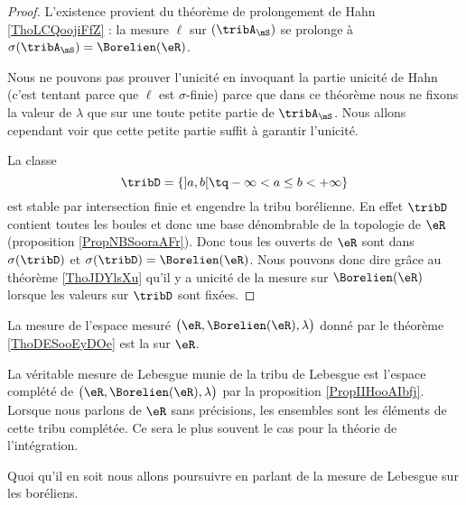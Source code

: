\begin{proof}
    
    L'existence provient du théorème de prolongement de Hahn \ref{ThoLCQoojiFfZ} : la mesure \( \ell\) sur \( (\tribA_{\mS})\) se prolonge à \( \sigma(\tribA_{\mS})=\Borelien(\eR)\).

    Nous ne pouvons pas prouver l'unicité en invoquant la partie unicité de Hahn (c'est tentant parce que \( \ell\) est \( \sigma\)-finie) parce que dans ce théorème nous ne fixons la valeur de \( \lambda\) que sur une toute petite partie de \( \tribA_{\mS}\). Nous allons cependant voir que cette petite partie suffit à garantir l'unicité.

    La classe 
    \begin{equation}
        \tribD=\{ \mathopen] a , b \mathclose[\tq -\infty<a\leq b< +\infty \}
    \end{equation}
    est stable par intersection finie et engendre la tribu borélienne. En effet \( \tribD\) contient toutes les boules et donc une base dénombrable de la topologie de \( \eR\) (proposition \ref{PropNBSooraAFr}). Donc tous les ouverts de \( \eR\) sont dans \( \sigma(\tribD)\) et \( \sigma(\tribD)=\Borelien(\eR)\). Nous pouvons donc dire grâce au théorème \ref{ThoJDYlsXu} qu'il y a unicité de la mesure sur \( \Borelien(\eR)\) lorsque les valeurs sur \( \tribD\) sont fixées.
\end{proof}

\begin{definition}
    La mesure de l'espace mesuré \( \big( \eR,\Borelien(\eR),\lambda \big)\) donné par le théorème \ref{ThoDESooEyDOe} est la  sur \( \eR\).
\end{definition}

\begin{remark}
    La véritable mesure de Lebesgue munie de la tribu de Lebesgue est l'espace complété de \( \big( \eR,\Borelien(\eR),\lambda \big)\) par la proposition \ref{PropIIHooAIbfj}. Lorsque nous parlons de \( \eR\) sans précisions, les ensembles  sont les éléments de cette tribu complétée. Ce sera le plus souvent le cas pour la théorie de l'intégration.

    Quoi qu'il en soit nous allons poursuivre en parlant de la mesure de Lebesgue sur les boréliens.
\end{remark}

